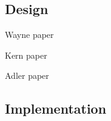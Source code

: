 \subsection{Design}

Wayne paper~\cite{Wayne}

Kern paper~\cite{Kern}

Adler paper~\cite{Adler}

\subsection{Implementation}

